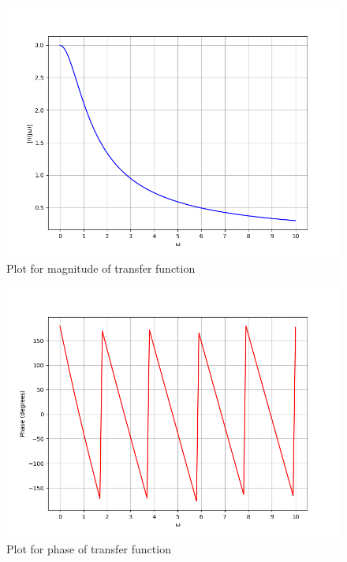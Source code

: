 \documentclass[journal,12pt,twocolumn]{IEEEtran}
\theoremstyle{remark}
\begin{document}
\begin{figure}[h!]
    \centering
    \includegraphics[width=\columnwidth]{2022/IN/11/figs/freq.png}
    \caption{Plot for magnitude of transfer function}
    \label{fig:gate2022in11fig1}
\end{figure}
\begin{figure}[h!]
    \centering
    \includegraphics[width=\columnwidth]{2022/IN/11/figs/phase.png}
    \caption{Plot for phase of transfer function}
    \label{fig:gate2022in11fig2}
\end{figure}
\end{document}
